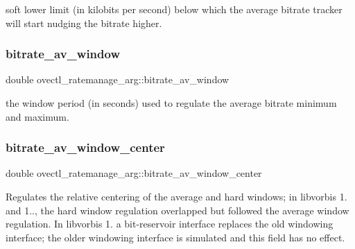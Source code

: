soft lower limit (in kilobits per second) below which the average bitrate tracker will start nudging the bitrate higher. \mbox{\label{structovectl__ratemanage__arg_a1232e7296ae5e52f52039bed2560c505}} 
\subsubsection{\texorpdfstring{bitrate\+\_\+av\+\_\+window}{bitrate\_av\_window}}
{\footnotesize\ttfamily double ovectl\+\_\+ratemanage\+\_\+arg\+::bitrate\+\_\+av\+\_\+window}

the window period (in seconds) used to regulate the average bitrate minimum and maximum. \mbox{\label{structovectl__ratemanage__arg_aad317d50fb4d072e2c55f0a60d1a83b2}} 
\subsubsection{\texorpdfstring{bitrate\+\_\+av\+\_\+window\+\_\+center}{bitrate\_av\_window\_center}}
{\footnotesize\ttfamily double ovectl\+\_\+ratemanage\+\_\+arg\+::bitrate\+\_\+av\+\_\+window\+\_\+center}

Regulates the relative centering of the average and hard windows; in libvorbis 1. and 1.., the hard window regulation overlapped but followed the average window regulation. In libvorbis 1. a bit-\/reservoir interface replaces the old windowing interface; the older windowing interface is simulated and this field has no effect. \mbox{\label{structovectl__ratemanage__arg_a3620024b5a9e4b4df6d20deb6c125c92}} 
